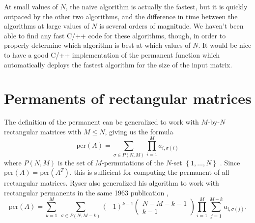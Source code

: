 \documentclass{article}
\begin{document}
At small values of $N$, the naive algorithm is actually the fastest, but it is quickly outpaced by
the other two algorithms, and the difference in time between the algorithms at large values of $N$
is several orders of magnitude. We haven't been able to find any fast C/++ code for these
algorithms, though, in order to properly determine which algorithm is best at which values of $N$.
It would be nice to have a good C/++ implementation of the permanent function which automatically
deploys the fastest algorithm for the size of the input matrix.

\section*{Permanents of rectangular matrices}

The definition of the permanent can be generalized to work with $M$-by-$N$ rectangular matrices with
$M \leq N$, giving us the formula
\begin{equation} \label{eq:rectper1}
    \text{per}(A) = \sum_{\sigma \in P(N,M)}{\prod_{i=1}^M{a_{i,{\sigma(i)}}}}
\end{equation}
where $P(N,M)$ is the set of $M$-permutations of the $N$-set $\left\{1,\dots,N\right\}$
\cite{wiki:permanent}. Since $\text{per}(A) = \text{per}(A^T)$, this is sufficient for computing
the permanent of all rectangular matrices. Ryser also generalized his algorithm to work with
rectangular permanents in the same 1963 publication \cite{wiki:permanent,ryser1963},
\begin{equation} \label{eq:rectper2}
    \text{per}(A) = \sum_{k=1}^{M}{
        ~\sum_{\sigma \in P(N,M-k)}{
            {\left(-1\right)}^{k-1} \left(\begin{matrix}N - M - k - 1\\ k - 1\end{matrix}\right)
            \prod_{i=1}^M{\sum_{j=1}^{M - k}{a_{i,{\sigma(j)}}}}
        }
    }.
\end{equation}
\end{document}
